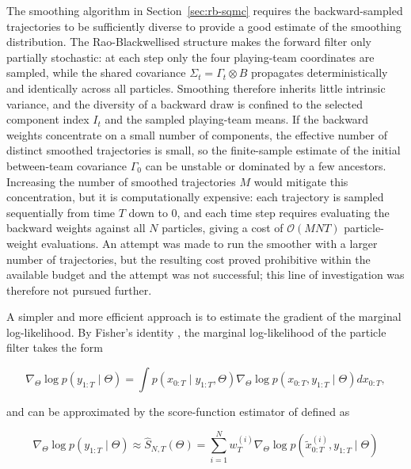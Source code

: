 The smoothing algorithm in Section~\ref{sec:rb-sqmc} requires the backward-sampled trajectories to be sufficiently diverse to provide a good estimate of the smoothing distribution. The Rao-Blackwellised structure makes the forward filter only partially stochastic: at each step only the four playing-team coordinates are sampled, while the shared covariance $\Sigma_t = \Gamma_t \otimes B$ propagates deterministically and identically across all particles. Smoothing therefore inherits little intrinsic variance, and the diversity of a backward draw is confined to the selected component index $I_t$ and the sampled playing-team means. If the backward weights concentrate on a small number of components, the effective number of distinct smoothed trajectories is small, so the finite-sample estimate of the initial between-team covariance $\Gamma_0$ can be unstable or dominated by a few ancestors. Increasing the number of smoothed trajectories $M$ would mitigate this concentration, but it is computationally expensive: each trajectory is sampled sequentially from time $T$ down to $0$, and each time step requires evaluating the backward weights against all $N$ particles, giving a cost of $\mathcal{O}(MNT)$ particle-weight evaluations. An attempt was made to run the smoother with a larger number of trajectories, but the resulting cost proved prohibitive within the available budget and the attempt was not successful; this line of investigation was therefore not pursued further.

A simpler and more efficient approach is to estimate the gradient of the marginal log-likelihood. By Fisher's identity \citep{delmoral2004feynman,delmoraldoucetsingh2010forwardsmoothing}, the marginal log-likelihood of the particle filter takes the form

\begin{equation*}\nabla_\Theta \log p(y_{1:T} \mid \Theta) = \int p(x_{0:T} \mid y_{1:T}, \Theta) \nabla_\Theta \log p(x_{0:T}, y_{1:T} \mid \Theta) dx_{0:T},\end{equation*}

and can be approximated by the score-function estimator of \citet{poyiadjisdoucetsingh2011particlescore} defined as 

\begin{equation}
    \label{eq:score-estimator}
    \nabla_\Theta \log p(y_{1:T} \mid \Theta) \approx \widehat{S}_{N,T}(\Theta) = \sum_{i=1}^N w_T^{(i)} \nabla_\Theta \log p(\widetilde{x}_{0:T}^{(i)}, y_{1:T} \mid \Theta)
\end{equation}


